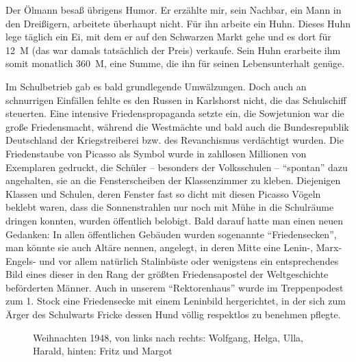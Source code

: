 \documentclass[a5paper,pagesize,10pt,twoside=true]{scrbook}
\renewcommand{\marginpar}[2][]{}
\begin{document}
Der Ölmann besaß übrigens Humor. Er erzählte mir, sein Nachbar, ein Mann in den Dreißigern, arbeitete überhaupt nicht. Für ihn arbeite ein \marginpar{144} Huhn. Dieses Huhn lege täglich ein Ei, mit dem er auf den Schwarzen Markt gehe und es dort für 12~M (das war damals tatsächlich der Preis) verkaufe. Sein Huhn erarbeite ihm somit monatlich 360~M, eine Summe, die ihn für seinen Lebensunterhalt genüge.

Im Schulbetrieb gab es bald grundlegende Umwälzungen. Doch auch an schnurrigen Einfällen fehlte es den Russen in Karlshorst nicht, die das Schulschiff steuerten. Eine intensive Friedenspropaganda setzte ein, die Sowjetunion war die große Friedensmacht, während die Westmächte und bald auch die Bundesrepublik Deutschland der Kriegstreiberei bzw. des Revanchismus verdächtigt wurden. Die Friedenstaube von Picasso als Symbol wurde in zahllosen Millionen von Exemplaren gedruckt, die Schüler -- besonders der Volksschulen -- \enquote{spontan} dazu angehalten, sie an die Fensterscheiben der Klassenzimmer zu kleben. Diejenigen Klassen und Schulen, deren Fenster fast so dicht mit diesen Picasso Vögeln beklebt waren, dass die Sonnenstrahlen nur noch mit Mühe in die Schulräume dringen konnten, wurden öffentlich belobigt. Bald darauf hatte man einen neuen Gedanken: In allen öffentlichen Gebäuden wurden sogenannte \enquote{Friedensecken}, man könnte sie auch Altäre nennen, angelegt, in deren \marginpar{145} Mitte eine Lenin-, Marx-Engels- und vor allem natürlich Stalinbüste oder wenigstens ein entsprechendes Bild eines dieser in den Rang der größten Friedensapostel der Weltgeschichte beförderten Männer. Auch in unserem \enquote{Rektorenhaus} wurde im Treppenpodest zum 1. Stock eine Friedensecke mit einem Leninbild hergerichtet, in der sich zum Ärger des Schulwarts Fricke dessen Hund völlig respektlos zu benehmen pflegte.

\begin{figure}[t]
	\caption{Weihnachten 1948, von links nach rechts: Wolfgang, Helga, Ulla, Harald, hinten: Fritz und Margot}
	\label{fig:weihnachten_1948}
\end{figure}
\end{document}
